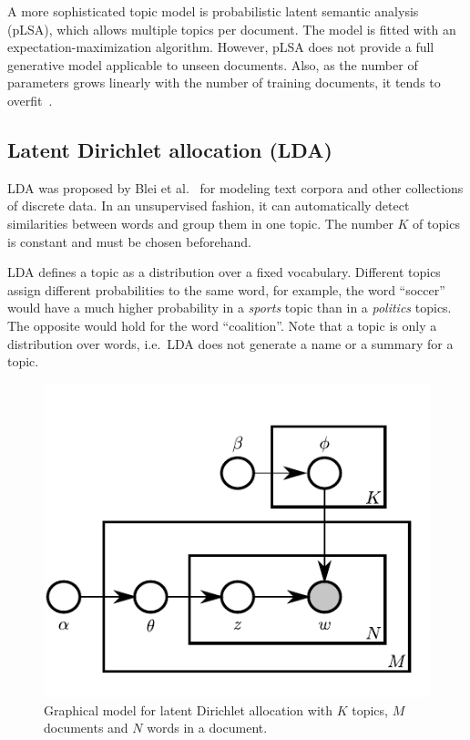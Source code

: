 \documentclass[
        a4paper,
        titlepage,
        twoside,
        parskip
        ]{scrbook}
\theoremstyle{break}
\begin{document}
A more sophisticated topic model is probabilistic latent semantic analysis (pLSA), which allows multiple topics per document.
The model is fitted with an expectation-maximization algorithm.
However, pLSA does not provide a full generative model applicable to unseen documents.
Also, as the number of parameters grows linearly with the number of training documents, it tends to overfit~\cite{Blei2003}.

\subsection{Latent Dirichlet allocation (LDA)}
LDA was proposed by Blei et al.~\cite{Blei2003} for modeling text corpora and other collections of discrete data.
In an unsupervised fashion, it can automatically detect similarities between words and group them in one topic.
The number $K$ of topics is constant and must be chosen beforehand.

LDA defines a topic as a distribution over a fixed vocabulary.
Different topics assign different probabilities to the same word, for example, the word ``soccer'' would have a much higher probability in a \emph{sports} topic than in a \emph{politics} topics.
The opposite would hold for the word ``coalition''.
Note that a topic is only a distribution over words, i.e.\ LDA does not generate a name or a summary for a topic.

\begin{figure}
       \centering
       \includegraphics{figures/lda.pdf}
       \caption{Graphical model for latent Dirichlet allocation with $K$ topics, $M$ documents and $N$ words in a document.}
       \label{fig:lda}
\end{figure}
\end{document}
